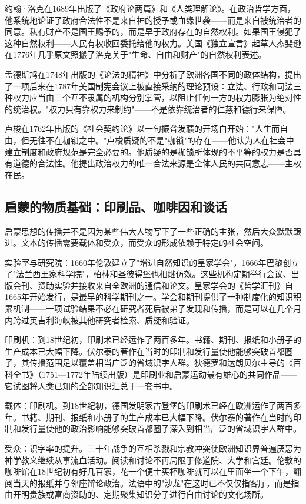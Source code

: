 \documentclass[a4paper,12pt]{ctexart}
\begin{document}
约翰·洛克在1689年出版了《政府论两篇》和《人类理解论》。在政治哲学方面，他系统地论证了政府合法性不是来自神的授予或血缘世袭——而是来自被统治者的同意。私有财产不是国王赐予的，而是早于政府存在的自然权利。如果国王侵犯了这种自然权利——人民有权收回委托给他的权力。美国《独立宣言》起草人杰斐逊在1776年几乎原文照搬了洛克关于"生命、自由和财产"的自然权利表述。

孟德斯鸠在1748年出版的《论法的精神》中分析了欧洲各国不同的政体结构，提出了一项后来在1787年美国制宪会议上被直接采纳的理论预设：立法、行政和司法三种权力应当由三个互不隶属的机构分别掌管，以阻止任何一方的权力膨胀为绝对性的统治权。"权力只有靠权力来制约"——不是依靠统治者的仁慈和德行来保障。

卢梭在1762年出版的《社会契约论》以一句振聋发聩的开场白开始："人生而自由，但无往不在枷锁之中。"卢梭质疑的不是"枷锁"的存在——他认为人在社会中建立制度和政府规范是完全必要的。他质疑的是枷锁所体现的不平等的权力是否具有道德的合法性。他提出政治权力的唯一合法来源是全体人民的共同意志——主权在民。

\subsection{启蒙的物质基础：印刷品、咖啡因和谈话}

启蒙思想的传播并不是因为某些伟大人物写下了一些正确的主张，然后大众默默跟进。文本的传播需要载体和受众，而受众的形成依赖于特定的社会空间。

实验室与研究院：1660年伦敦建立了"增进自然知识的皇家学会"，1666年巴黎创立了"法兰西王家科学院"，柏林和圣彼得堡也相继仿效。这些机构定期举行会议、出版会刊、资助实验并接收来自全欧洲的通信和论文。皇家学会的《哲学汇刊》自1665年开始发行，是最早的科学期刊之一。学会和期刊提供了一种制度化的知识积累机制——一项试验结果不必在研究者死后被弟子发现和传播，而是可以在几个月内跨过英吉利海峡被其他研究者检索、质疑和验证。

印刷机：到18世纪初，印刷术已经运作了两百多年。书籍、期刊、报纸和小册子的生产成本已大幅下降。伏尔泰的著作在当时的印制和发行量使他能够突破首都圈子，其传播范围足以覆盖相当广泛的省域识字人群。狄德罗和达朗贝尔主导的《百科全书》（1751—1772年陆续出版）是印刷业和启蒙运动最有雄心的共同作品——它试图将人类已知的全部知识汇总于一套书中。

载体：印刷机。到18世纪初，德国发明家古登堡的印刷术已经在欧洲运作了两百多年。书籍、期刊、报纸和小册子的生产成本已大幅下降。伏尔泰的著作在当时的印制和发行量使他的政治影响能够突破首都圈子深入到相当广泛的省域识字人群中。

受众：识字率的提升。三十年战争的互相杀戮和宗教冲突使欧洲知识界普遍厌恶为神学教义继续从事流血活动。阅读和讨论不再局限于修道院、大学和宫廷。伦敦的咖啡馆在18世纪初有好几百家，花一个便士买杯咖啡就可以在里面坐一个下午，翻阅当天的报纸并与邻座辩论政治。法语中的"沙龙"在这时已不仅仅指客厅，而是指由开明贵族或富商资助的、定期聚集知识分子进行自由讨论的文化场所。
\end{document}

